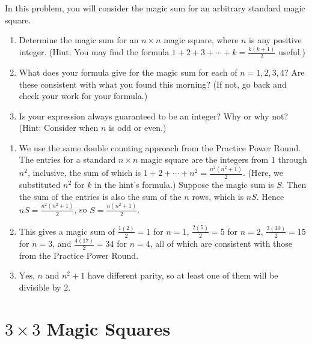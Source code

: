 \documentclass[11pt]{article}
\renewenvironment{problem}{\begin{problems}}{\end{problems}\vspace{5pt}}
\begin{document}
\begin{problem}[5=3+1+1 points]
In this problem, you will consider the magic sum for an arbitrary standard magic square.
\begin{enumerate}[label=(\alph*)]
\item Determine the magic sum for an $n \times n$ magic square, where $n$ is any positive integer.
(Hint: You may find the formula $1 + 2 + 3 + \cdots + k = \frac{k(k+1)}{2}$ useful.)

\item What does your formula give for the magic sum for each of $n = 1, 2, 3, 4$?
Are these consistent with what you found this morning?
(If not, go back and check your work for your formula.)

\item Is your expression always guaranteed to be an integer? Why or why not? (Hint: Consider when $n$ is odd
or even.)
\end{enumerate}
\end{problem}

\begin{solution}
\begin{enumerate}[label=(\alph*)]
\item We use the same double counting approach from the Practice Power Round. The entries for a standard
$n \times n$ magic square are the integers from $1$ through $n^2$, inclusive, the sum of which is
$1 + 2 + \cdots + n^2 = \frac{n^2(n^2+1)}{2}$. (Here, we substituted $n^2$ for $k$ in the hint's formula.)
Suppose the magic sum is $S$. Then the sum of the entries is also the sum of the $n$ rows, which is $nS$.
Hence $nS = \frac{n^2(n^2+1)}{2}$, so $S = \boxed{\frac{n(n^2+1)}{2}}$.

\item This gives a magic sum of $\frac{1(2)}{2} = 1$ for $n = 1$, $\frac{2(5)}{2} = 5$ for $n = 2$,
$\frac{3(10)}{2} = 15$ for $n = 3$, and $\frac{4(17)}{2} = 34$ for $n = 4$, all of which are consistent
with those from the Practice Power Round.

\item $\boxed{\text{Yes}}$, $n$ and $n^2+1$ have different parity, so at least one of them will be divisible by $2$.
\end{enumerate}
\end{solution}


\section{$3 \times 3$ Magic Squares}
\end{document}

